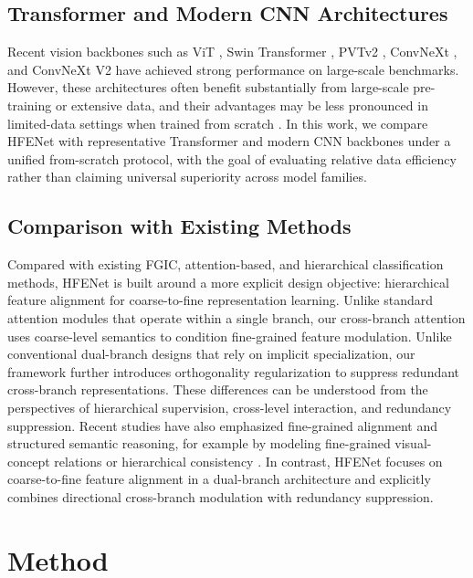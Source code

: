 \documentclass[pdflatex,iicol,sn-mathphys-num]{sn-jnl}
\theoremstyle{thmstyleone}%
\theoremstyle{thmstyletwo}%
\theoremstyle{thmstylethree}%
\begin{document}
\subsection{Transformer and Modern CNN Architectures}
Recent vision backbones such as ViT \cite{dosovitskiy2020image}, Swin Transformer \cite{liu2021swin}, PVTv2 \cite{wang2022pvt}, ConvNeXt \cite{liu2022convnext}, and ConvNeXt V2 \cite{woo2023convnextv2} have achieved strong performance on large-scale benchmarks. 
However, these architectures often benefit substantially from large-scale pre-training or extensive data, and their advantages may be less pronounced in limited-data settings when trained from scratch \cite{touvron2021training}.
In this work, we compare HFENet with representative Transformer and modern CNN backbones under a unified from-scratch protocol, with the goal of evaluating relative data efficiency rather than claiming universal superiority across model families.

\subsection{Comparison with Existing Methods}
Compared with existing FGIC, attention-based, and hierarchical classification methods, HFENet is built around a more explicit design objective: hierarchical feature alignment for coarse-to-fine representation learning. 
Unlike standard attention modules that operate within a single branch, our cross-branch attention uses coarse-level semantics to condition fine-grained feature modulation. 
Unlike conventional dual-branch designs that rely on implicit specialization, our framework further introduces orthogonality regularization to suppress redundant cross-branch representations. 
These differences can be understood from the perspectives of hierarchical supervision, cross-level interaction, and redundancy suppression.
Recent studies have also emphasized fine-grained alignment and structured semantic reasoning, for example by modeling fine-grained visual-concept relations or hierarchical consistency \cite{xie2025dotcbm,gao2025chbc}. 
In contrast, HFENet focuses on coarse-to-fine feature alignment in a dual-branch architecture and explicitly combines directional cross-branch modulation with redundancy suppression.

\section{Method}
\label{sec:method}
\end{document}
